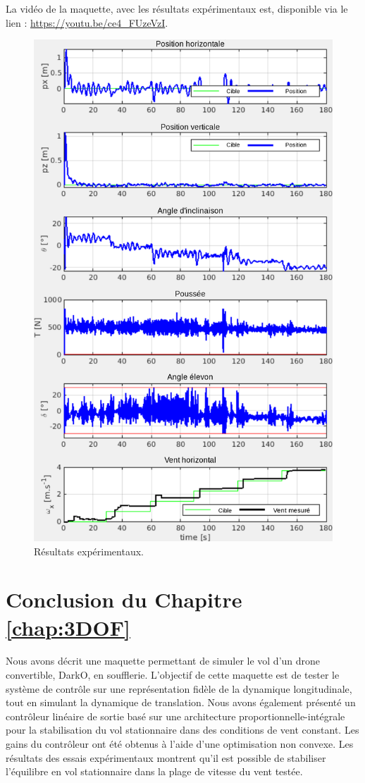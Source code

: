 La vidéo de la maquette, avec les résultats expérimentaux est, disponible via le lien : \url{https://youtu.be/ce4_FUzeVzI}.

\begin{figure}[!ht]
   \centering
    \includegraphics[width=0.7\columnwidth]{figures/exp.png}
    \caption{Résultats expérimentaux.}
    \label{fig_exp_centrage_arr}
\end{figure}

\section{Conclusion du Chapitre \ref{chap:3DOF}}
Nous avons décrit une maquette permettant de simuler le vol d'un drone convertible, DarkO, en soufflerie. L'objectif de cette maquette est de tester le système de contrôle sur une représentation fidèle de la dynamique longitudinale, tout en simulant la dynamique de translation. Nous avons également présenté un contrôleur linéaire de sortie basé sur une architecture proportionnelle-intégrale pour la stabilisation du vol stationnaire dans des conditions de vent constant. Les gains du contrôleur ont été obtenus à l'aide d'une optimisation non convexe. Les résultats des essais expérimentaux montrent qu'il est possible de stabiliser l'équilibre en vol stationnaire dans la plage de vitesse du vent testée. 

